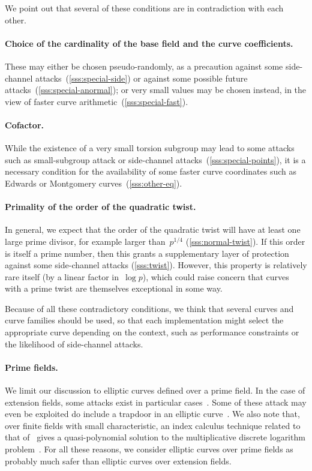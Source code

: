 \documentclass[twocolumn,letterpaper]{article}
\begin{document}
\bigbreak

We point out that several of these conditions are in contradiction
with each other.

\paragraph{Choice of the cardinality of the base field
and the curve coefficients.}
These may either be chosen pseudo-randomly,
as a precaution against some side-channel attacks~(\ref{sss:special-side})
or against some possible future attacks~(\ref{sss:special-anormal});
or very small values may be chosen instead,
in the view of faster curve arithmetic~(\ref{sss:special-fast}).

\paragraph{Cofactor.}
While the existence of a very small torsion subgroup
may lead to some attacks such as
small-subgroup attack or side-channel attacks~(\ref{sss:special-points}),
it is a necessary condition for the availability
of some faster curve coordinates
such as Edwards or Montgomery curves~(\ref{sss:other-eq}).

\paragraph{Primality of the order of the quadratic twist.}
In general, we expect that the order of the quadratic twist
will have at least one large prime divisor,
for example larger than~$p^{1/4}$ (\ref{sss:normal-twist}).
If this order is itself a prime number,
then this grants a supplementary layer of protection
against some side-channel attacks (\ref{sss:twist}).
However, this property is relatively rare itself
(by a linear factor in~$\log p$),
which could raise concern that
curves with a prime twist are themselves exceptional in some way.

Because of all these contradictory conditions,
we think that several curves and curve families should be used,
so that each implementation might select the appropriate curve
depending on the context,
such as performance constraints or the likelihood of side-channel attacks.

\paragraph{Prime fields.}%
We limit our discussion to elliptic curves defined over a prime field.
In the case of extension fields,
some attacks exist in particular
cases~\cite{jc2013jv,rsa2004mtw,asia1999dgm,jc2002ghs}.
Some of these attack may even be exploited
do include a trapdoor in an elliptic curve~\cite{jc2006teske}.
We also note that, over finite fields with small characteristic,
an index calculus technique related to that of~\cite{jc2013jv}
gives a quasi-polynomial solution to
the multiplicative discrete logarithm problem~\cite{euro2014bgjt}.
For all these reasons, we consider elliptic curves over prime fields
as probably much safer than elliptic curves over extension fields.
\end{document}
